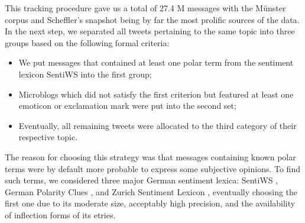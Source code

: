 




This tracking procedure gave us a total of 27.4 M messages with the
M\"unster corpus and Scheffler's snapshot being by far the most
prolific sources of the data.  In the next step, we separated all
tweets pertaining to the same topic into three groups based on the
following formal criteria:
\begin{itemize}
\item We put messages that contained at least one polar term from the
  sentiment lexicon SentiWS \cite{Remus:10} into the first group;
\item Microblogs which did not satisfy the first criterion but
  featured at least one emoticon or exclamation mark were put into the
  second set;
\item Eventually, all remaining tweets were allocated to the third
  category of their respective topic.
\end{itemize}
The reason for choosing this strategy was that messages containing
known polar terms were by default more probable to express some
subjective opinions.  To find such terms, we considered three major
German sentiment lexica: SentiWS \cite{Remus:10}, German Polarity
Clues \cite{Waltinger:10}, and Zurich Sentiment Lexicon
\cite{Clematide:10}, eventually choosing the first one due to its
moderate size, acceptably high precision, and the availability of
inflection forms of its etries.

